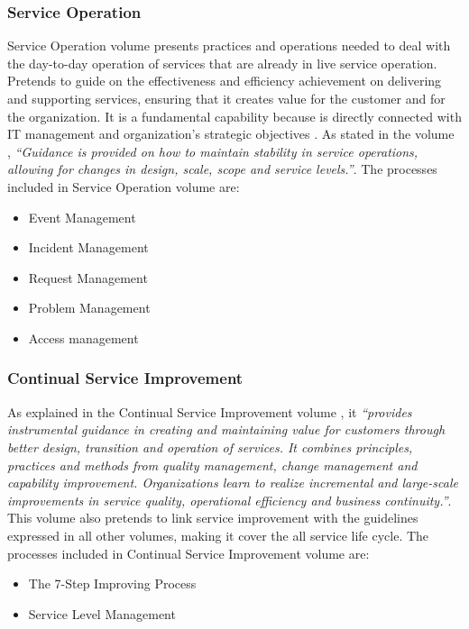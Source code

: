 \subsubsection{Service Operation} 

Service Operation volume presents practices and operations needed to deal with the day-to-day operation of services that are already in live service operation. Pretends to guide on the effectiveness and efficiency achievement on delivering and supporting services, ensuring that it creates value for the customer and for the organization. It is a fundamental capability because is directly connected with IT management and organization's strategic objectives . As stated in the volume \cite{itilSO}, \textit{``Guidance is provided on how to maintain stability in service operations, allowing for changes in design, scale, scope and service levels.''}. The processes included in Service Operation volume are:

\begin{itemize}
  \item Event Management
  \item Incident Management
  \item Request Management
  \item Problem Management
  \item Access management
\end{itemize} 

\subsubsection{Continual Service Improvement}

As explained in the Continual Service Improvement volume \cite{itilST}, it \textit{``provides instrumental guidance in creating and maintaining value for customers through better design, transition and operation of services. It combines principles, practices and methods from quality management, change management and capability improvement. Organizations learn to realize incremental and large-scale improvements in service quality, operational efficiency and business continuity.''}. This volume also pretends to link service improvement with the guidelines expressed in all other volumes, making it cover the all service life cycle. The processes included in Continual Service Improvement volume are:

\begin{itemize}
  \item The 7-Step Improving Process
  \item Service Level Management
\end{itemize} 

